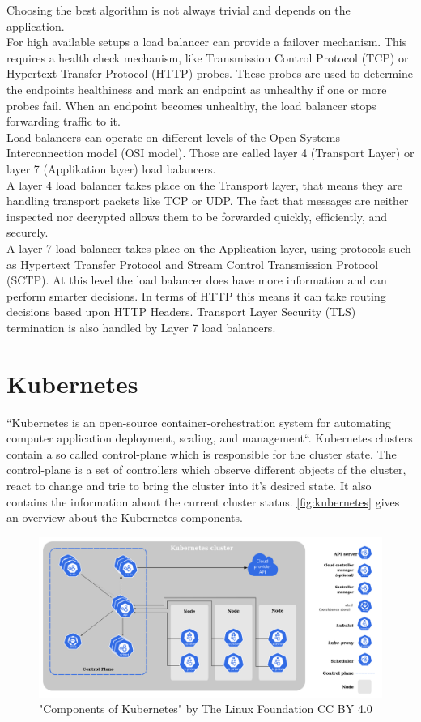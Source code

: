 Choosing the best algorithm is not always trivial and depends on the application.~\cite{ALLEN-LOAD-BALANCING}
\\
For high available setups a load balancer can provide a failover mechanism.
This requires a health check mechanism, like Transmission Control Protocol (TCP) or Hypertext Transfer Protocol (HTTP) probes.
These probes are used to determine the endpoints healthiness and mark an endpoint as unhealthy if one or more probes fail.
When an endpoint becomes unhealthy, the load balancer stops forwarding traffic to it.
\\
Load balancers can operate on different levels of the Open Systems Interconnection model (OSI model).
Those are called layer 4 (Transport Layer) or layer 7 (Applikation layer) load balancers.
\\
A layer 4 load balancer takes place on the Transport layer, that means they are handling transport packets like TCP or UDP.
The fact that messages are neither inspected nor decrypted allows them to be forwarded quickly, efficiently, and securely.
\\
A layer 7 load balancer takes place on the Application layer, using protocols such as Hypertext Transfer Protocol and Stream Control Transmission Protocol (SCTP).
At this level the load balancer does have more information and can perform smarter decisions.
In terms of HTTP this means it can take routing decisions based upon HTTP Headers.
Transport Layer Security (TLS) termination is also handled by Layer 7 load balancers.~\cite{NICHOLSON-LOAD-BALANCING}

\section{Kubernetes}
``Kubernetes is an open-source container-orchestration system for automating computer application deployment, scaling, and management``\cite{Kubernetes}.
Kubernetes clusters contain a so called control-plane which is responsible for the cluster state.
The control-plane is a set of controllers which observe different objects of the cluster, react to change and trie to bring the cluster into it's desired state.
It also contains the information about the current cluster status.
\autoref{fig:kubernetes} gives an overview about the Kubernetes components.

\begin{figure}[H]
    \centering
    \includegraphics[width=1\linewidth]{media/02/kubernetes}
    \caption{"Components of Kubernetes" by The Linux Foundation CC BY 4.0}
    \label{fig:kubernetes}
\end{figure}

